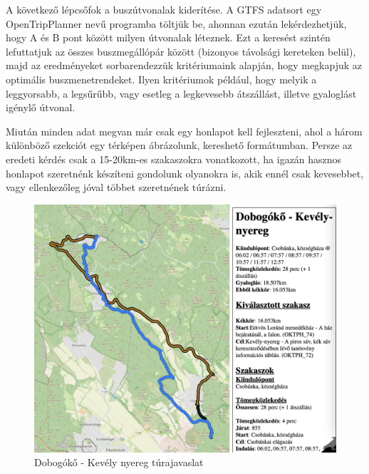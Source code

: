 \documentclass[a5paper,10pt]{article}
\begin{document}
\bigskip

A következő lépcsőfok a buszútvonalak kiderítése. A GTFS adatsort egy OpenTripPlanner\cite{opentripplanner} nevű programba töltjük be, ahonnan ezután lekérdezhetjük, hogy A és B pont között milyen útvonalak léteznek. Ezt a keresést szintén lefuttatjuk az összes buszmegállópár között (bizonyos távolsági kereteken belül), majd az eredményeket sorbarendezzük kritériumaink alapján, hogy megkapjuk az optimális buszmenetrendeket. Ilyen kritériumok például, hogy melyik a leggyorsabb, a legsűrűbb, vagy esetleg a legkevesebb átszállást, illetve gyaloglást igénylő útvonal.

\bigskip

Miután minden adat megvan már csak egy honlapot kell fejleszteni, ahol a három különböző szekciót egy térképen ábrázolunk, kereshető formátumban. Persze az eredeti kérdés csak a 15-20km-es szakaszokra vonatkozott, ha igazán hasznos honlapot szeretnénk készíteni gondolunk olyanokra is, akik ennél csak kevesebbet, vagy ellenkezőleg jóval többet szeretnének túrázni.

\bigskip

\begin{figure}[!htbp]
    \centering
    \includegraphics[width=\textwidth]{images/kekkor_results.png}
    \EndAccSupp{}%
    \caption{Dobogókő - Kevély nyereg túrajavaslat}
    \label{kekkor:answer}
\end{figure}
\end{document}
